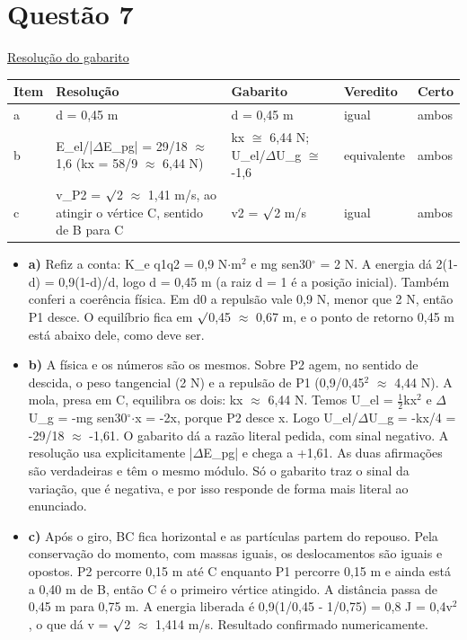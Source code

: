 \documentclass{article}%
\begin{document}
\section*{Questão 7}%
\href{https://poliedroresolve.sistemapoliedro.com.br/vestibulares/ime/2027/ime-2-fase-dia-2-27-10-2026-2-fase-dia-2/dissertativa-7-fisica-2-fase-dia-2-ime-2027}{Resolução do gabarito}\par\smallskip%
\begin{longtable}{@{}p{} p{} p{} p{} p{}@{}}\toprule Item & Resolução & Gabarito & Veredito & Certo \\ \midrule
a & d = 0,45 m & d = 0,45 m & igual & ambos \\
b & E\_el/|$\Delta$E\_pg| = 29/18 $\approx$ 1,6 (kx = 58/9 $\approx$ 6,44 N) & kx $\cong$ 6,44 N; U\_el/$\Delta$U\_g $\cong$ -1,6 & equivalente & ambos \\
c & v\_P2 = $\surd$2 $\approx$ 1,41 m/s, ao atingir o vértice C, sentido de B para C & v2 = $\surd$2 m/s & igual & ambos \\
\bottomrule\end{longtable}%
\begin{itemize}%
\item%
\textbf{a)} Refiz a conta: K\_e q1q2 = 0,9 N$\cdot$m$^2$ e mg sen30$^\circ$ = 2 N. A energia dá 2(1-d) = 0,9(1-d)/d, logo d = 0,45 m (a raiz d = 1 é a posição inicial). Também conferi a coerência física. Em d0 a repulsão vale 0,9 N, menor que 2 N, então P1 desce. O equilíbrio fica em $\surd$0,45 $\approx$ 0,67 m, e o ponto de retorno 0,45 m está abaixo dele, como deve ser.%
\item%
\textbf{b)} A física e os números são os mesmos. Sobre P2 agem, no sentido de descida, o peso tangencial (2 N) e a repulsão de P1 (0,9/0,45$^2$ $\approx$ 4,44 N). A mola, presa em C, equilibra os dois: kx $\approx$ 6,44 N. Temos U\_el = $\frac12$kx$^2$ e $\Delta$U\_g = -mg sen30$^\circ$$\cdot$x = -2x, porque P2 desce x. Logo U\_el/$\Delta$U\_g = -kx/4 = -29/18 $\approx$ -1,61. O gabarito dá a razão literal pedida, com sinal negativo. A resolução usa explicitamente |$\Delta$E\_pg| e chega a +1,61. As duas afirmações são verdadeiras e têm o mesmo módulo. Só o gabarito traz o sinal da variação, que é negativa, e por isso responde de forma mais literal ao enunciado.%
\item%
\textbf{c)} Após o giro, BC fica horizontal e as partículas partem do repouso. Pela conservação do momento, com massas iguais, os deslocamentos são iguais e opostos. P2 percorre 0,15 m até C enquanto P1 percorre 0,15 m e ainda está a 0,40 m de B, então C é o primeiro vértice atingido. A distância passa de 0,45 m para 0,75 m. A energia liberada é 0,9(1/0,45 - 1/0,75) = 0,8 J = 0,4v$^2$, o que dá v = $\surd$2 $\approx$ 1,414 m/s. Resultado confirmado numericamente.%
\end{itemize}%
\end{document}
